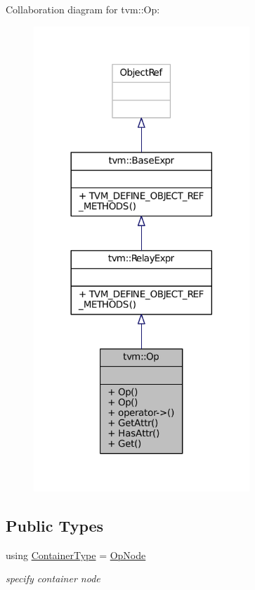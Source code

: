 Collaboration diagram for tvm\+:\+:Op\+:
\nopagebreak
\begin{figure}[H]
\begin{center}
\leavevmode
\includegraphics[width=230pt]{classtvm_1_1Op__coll__graph}
\end{center}
\end{figure}
\subsection*{Public Types}
\begin{DoxyCompactItemize}
\item 
using \hyperlink{classtvm_1_1Op_a03bdb10e7fe5aac4e638523ab030c1e4}{Container\+Type} = \hyperlink{classtvm_1_1OpNode}{Op\+Node}
\begin{DoxyCompactList}\small\item\em specify container node \end{DoxyCompactList}\end{DoxyCompactItemize}
